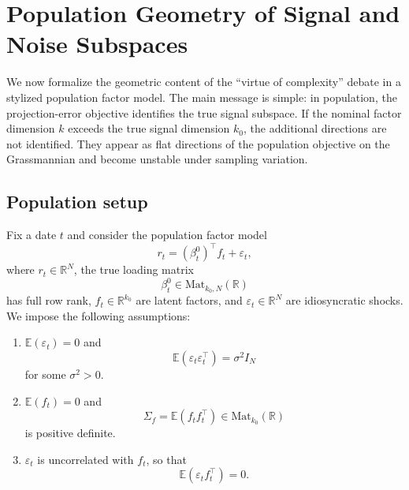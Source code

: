 \documentclass[11pt,letterpaper]{article}
\newcommand{\bR}{\mathbb{R}}
\begin{document}
\section{Population Geometry of Signal and Noise Subspaces}
\label{sec:pop_setup}

We now formalize the geometric content of the ``virtue of complexity'' debate in a stylized population factor model. The main message is simple: in population, the projection-error objective identifies the true signal subspace. If the nominal factor dimension $k$ exceeds the true signal dimension $k_0$, the additional directions are not identified. They appear as flat directions of the population objective on the Grassmannian and become unstable under sampling variation.

\subsection{Population setup}
\label{subsec:population-setup}

Fix a date $t$ and consider the population factor model
\begin{equation}
\label{eq:pop-factor-model}
r_t = (\beta_t^0)^\top f_t + \varepsilon_t,
\end{equation}
where $r_t\in\bR^N$, the true loading matrix
\begin{equation*}
\beta_t^0\in \mathrm{Mat}_{k_0,N}(\bR)
\end{equation*}
has full row rank, $f_t\in\bR^{k_0}$ are latent factors, and $\varepsilon_t\in\bR^N$ are idiosyncratic shocks. We impose the following assumptions:
\begin{enumerate}[label=(A\arabic*)]
\item\label{A1}
$\mathbb{E}(\varepsilon_t)=0$ and
\begin{equation*}
\mathbb{E}(\varepsilon_t\varepsilon_t^\top)=\sigma^2 I_N
\end{equation*}
for some $\sigma^2>0$.

\item\label{A2}
$\mathbb{E}(f_t)=0$ and
\begin{equation*}
\Sigma_f = \mathbb{E}(f_t f_t^\top) \in \mathrm{Mat}_{k_0}(\bR)
\end{equation*}
is positive definite.

\item\label{A3}
$\varepsilon_t$ is uncorrelated with $f_t$, so that
\begin{equation*}
\mathbb{E}(\varepsilon_t f_t^\top)=0.
\end{equation*}
\end{enumerate}
\end{document}
